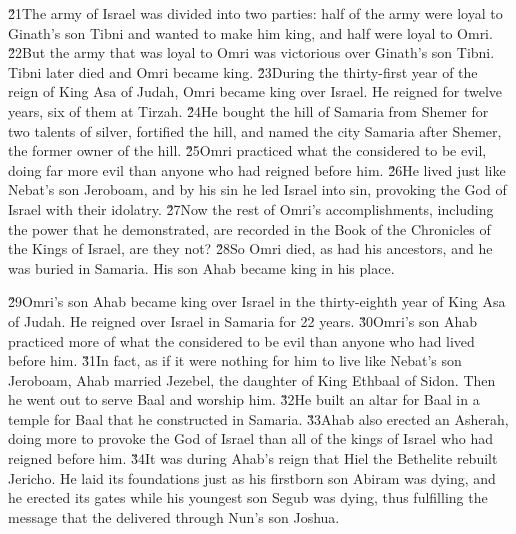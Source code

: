 \v{21}The army of Israel was divided into two parties: half of the army were loyal to Ginath's son Tibni and wanted to make him king, and half were loyal to Omri. \v{22}But the army that was loyal to Omri was victorious over Ginath's son Tibni. Tibni later died and Omri became king. \v{23}During the thirty-first year of the reign of King Asa of Judah, Omri became king over Israel. He reigned for twelve years, six of them at Tirzah. \v{24}He bought the hill of Samaria from Shemer for two talents of silver, fortified the hill, and named the city Samaria after Shemer, the former owner of the hill. \v{25}Omri practiced what the  considered to be evil, doing far more evil than anyone who had reigned before him. \v{26}He lived just like Nebat's son Jeroboam, and by his sin he led Israel into sin, provoking the  God of Israel with their idolatry. \v{27}Now the rest of Omri's accomplishments, including the power that he demonstrated, are recorded in the Book of the Chronicles of the Kings of Israel, are they not? \v{28}So Omri died, as had his ancestors, and he was buried in Samaria. His son Ahab became king in his place.

\v{29}Omri's son Ahab became king over Israel in the thirty-eighth year of King Asa of Judah. He reigned over Israel in Samaria for 22 years. \v{30}Omri's son Ahab practiced more of what the  considered to be evil than anyone who had lived before him. \v{31}In fact, as if it were nothing for him to live like Nebat's son Jeroboam, Ahab married Jezebel, the daughter of King Ethbaal of Sidon. Then he went out to serve Baal and worship him. \v{32}He built an altar for Baal in a temple for Baal that he constructed in Samaria. \v{33}Ahab also erected an Asherah, doing more to provoke the  God of Israel than all of the kings of Israel who had reigned before him. \v{34}It was during Ahab's reign that Hiel the Bethelite rebuilt Jericho. He laid its foundations just as his firstborn son Abiram was dying, and he erected its gates while his youngest son Segub was dying, thus fulfilling the message that the  delivered through Nun's son Joshua.

